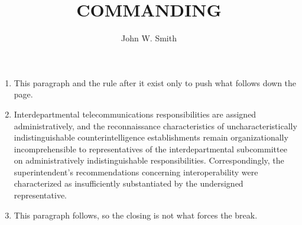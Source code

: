 \documentclass{../armymemo}
\author{John W. Smith}\rank{CPT}\branch{CY}
\title{COMMANDING}
\begin{document}
\begin{enumerate}
	\item This paragraph and the rule after it exist only to push what follows down
	      the page.\rule[-4.9in]{0pt}{0pt}
	\item Interdepartmental telecommunications responsibilities are assigned
	      administratively, and the reconnaissance characteristics of
	      uncharacteristically indistinguishable counterintelligence establishments
	      remain organizationally incomprehensible to representatives of the
	      interdepartmental subcommittee on administratively indistinguishable
	      responsibilities. Correspondingly, the superintendent's recommendations
	      concerning interoperability were characterized as insufficiently
	      substantiated by the undersigned representative.
	\item This paragraph follows, so the closing is not what forces the break.
\end{enumerate}
\end{document}
